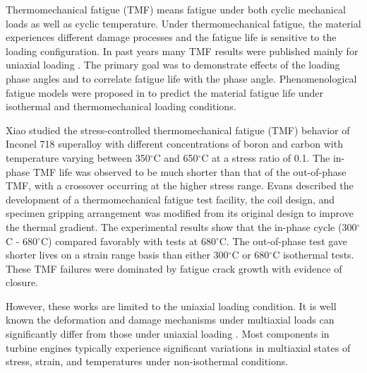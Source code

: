 Thermomechanical fatigue (TMF) means fatigue under both cyclic mechanical loads as well as cyclic temperature. Under thermomechanical fatigue, the material experiences different damage processes and the fatigue life is sensitive to the loading configuration. In past years many TMF results were published mainly for uniaxial loading \cite{Evans2008, Kulawinski201521, remy2003thermal, Bauer2009}. The primary goal was to demonstrate effects of the loading phase angles and to correlate fatigue life with the phase angle. Phenomenological fatigue models were proposed in \cite{Vose2013} to predict the material fatigue life under isothermal and thermomechanical loading conditions.

Xiao \cite{Xiao2006157} studied the stress-controlled thermomechanical fatigue (TMF) behavior of Inconel 718 superalloy with different concentrations of boron and carbon with temperature varying between 350$^{\circ}$C and 650$^{\circ}$C at a stress ratio of 0.1. The in-phase TMF life was observed to be much shorter than that of the out-of-phase TMF, with a crossover occurring at the higher stress range.
Evans \cite{evans2008thermo} described the development of a thermomechanical fatigue test facility, the coil design, and specimen gripping arrangement was modified from its original design to improve the thermal gradient.
The experimental results show that the in-phase cycle (300$^{\circ}$C - 680$^{\circ}$C) compared favorably with tests at 680$^{\circ}$C.
The out-of-phase test gave shorter lives on a strain range basis than either 300$^{\circ}$C or 680$^{\circ}$C isothermal tests.
These TMF failures were dominated by fatigue crack growth with evidence of closure.

However, these works are limited to the uniaxial loading condition.
It is well known the deformation and damage mechanisms under multiaxial loads can significantly differ from those under uniaxial loading \cite{fang2015cyclic,kang2004uniaxial,chen2004modified}. Most components in turbine engines typically experience significant variations in multiaxial states of stress, strain, and temperatures under non-isothermal conditions.

